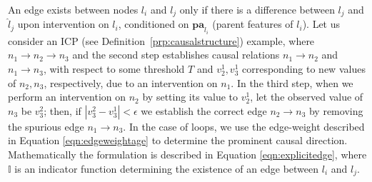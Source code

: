 \documentclass{article}
\newcommand{\ft}[1]{{\textcolor{red}{#1}}}
\newcommand{\ftcom}[2][]{\todo[author=FT, #1]{#2}}
\newcommand{\node}[1]{\ensuremath{n}_{#1}}
\begin{document}
An edge exists between nodes $l_i$ and $l_j$ only if there is a difference between $l_j$ and $\hat{l}_j$ upon intervention on $l_i$, conditioned on $\textbf{pa}_{l_i}$ (parent features of $l_i$).
Let us consider an ICP (see Definition~\ref{prp:causalstructure}) example, where $\node{1} \rightarrow \node{2} \rightarrow \node{3}$ and the second step establishes  causal relations $\node{1} \rightarrow \node{2}$ and $\node{1} \rightarrow \node{3}$, with respect to some threshold $T$ and ${v}^1_2, {v}^1_3$ corresponding to new values of $\node{2},\node{3}$, respectively, due to an intervention on $\node{1}$. 
In the third step, when we perform an intervention on $\node{2}$ by setting its value to ${v}^1_2$, let the observed value of $\node{3}$ be ${v}^2_3$; then, if $|{v}^2_3 - {v}^1_3| < \epsilon$ we establish the correct edge $\node{2} \rightarrow \node{3}$ by removing the spurious edge $\node{1} \rightarrow \node{3}$. 
In the case of loops, we use the edge-weight described in Equation \ref{eqn:edgeweightage} to determine the prominent causal direction.
Mathematically the formulation is described in Equation \ref{eqn:explicitedge}, where $\mathbb{I}$ is an indicator function determining the existence of an edge between $l_i$ and $l_j$.

\end{document}
